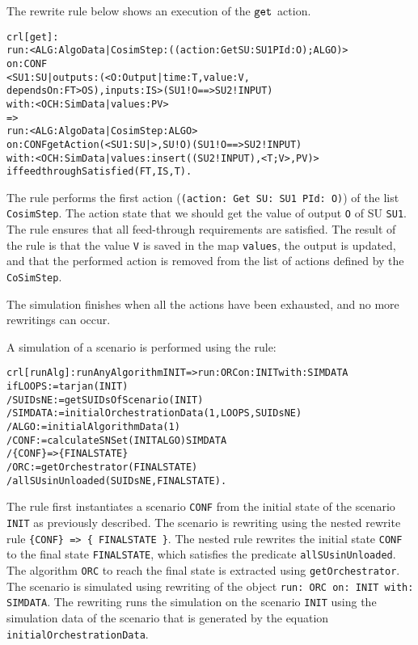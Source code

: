The rewrite rule below shows an execution of the $\mathtt{get}_{}$ action.
\small
\begin{alltt}
crl [get] : 
run: < ALG : AlgoData | CosimStep : ((action: Get SU: SU1 PId: O) ; ALGO) >
on: CONF
< SU1 : SU | outputs : (< O : Output | time : T, value : V, 
  dependsOn : FT > OS), inputs : IS > ( SU1 ! O ==> SU2 ! INPUT)
with: < OCH : SimData | values : PV >
=> 
run: < ALG : AlgoData | CosimStep : ALGO >
on: CONF getAction(< SU1 : SU | >, SU ! O) ( SU1 ! O ==> SU2 ! INPUT)
with: < OCH : SimData | values : insert((SU2 ! INPUT), < T ; V >, PV) > 
if feedthroughSatisfied(FT, IS, T) .
\end{alltt}
\normalsize
The rule performs the first action (\texttt{(action: Get SU: SU1 PId: O)}) of the list \texttt{CosimStep}.
The action state that we should get the value of output \texttt{O} of SU \texttt{SU1}.
The rule ensures that all feed-through requirements are satisfied.
The result of the rule is that the value \texttt{V} is saved in the map \texttt{values}, the output is updated, and that the performed action is removed from the list of actions defined by the \texttt{CoSimStep}.

The simulation finishes when all the actions have been exhausted, and no more rewritings can occur.

A simulation of a scenario is performed using the rule:
\small
\begin{alltt}
crl [runAlg] : runAnyAlgorithm INIT => run: ORC on: INIT with: SIMDATA
  if LOOPS := tarjan(INIT)
  / SUIDsNE := getSUIDsOfScenario(INIT)
  / SIMDATA := initialOrchestrationData(1,LOOPS,SUIDsNE)
  / ALGO := initialAlgorithmData(1)
  / CONF := calculateSNSet(INIT ALGO) SIMDATA 
  / \{CONF\} => \{ FINALSTATE \} 
  / ORC := getOrchestrator(FINALSTATE)
  / allSUsinUnloaded(SUIDsNE, FINALSTATE) .
\end{alltt}
\normalsize
The rule first instantiates a scenario \texttt{CONF} from the initial state of the scenario \texttt{INIT} as previously described.
The scenario is rewriting using the nested rewrite rule \texttt{\{CONF\} => \{ FINALSTATE \}}. 
The nested rule rewrites the initial state \texttt{CONF} to the final state \texttt{FINALSTATE}, which satisfies the predicate \texttt{allSUsinUnloaded}.
The algorithm \texttt{ORC} to reach the final state is extracted using \texttt{getOrchestrator}.
The scenario is simulated using rewriting of the object \texttt{run: ORC on: INIT with: SIMDATA}.
The rewriting runs the simulation on the scenario \texttt{INIT} using the simulation data of the scenario that is generated by the equation \texttt{initialOrchestrationData}.

